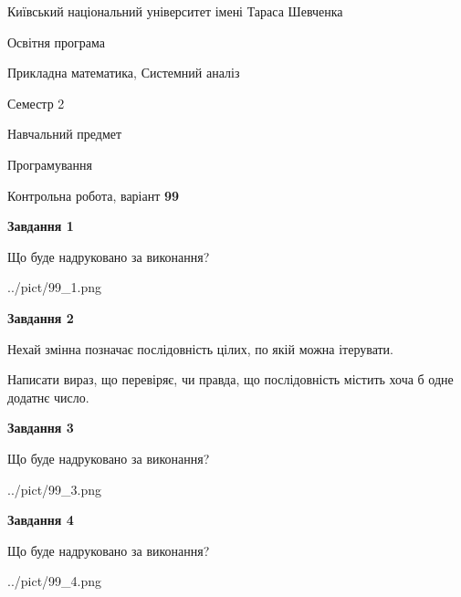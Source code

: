 \documentclass[12pt, ukrainian]{article}
\begin{document}
{{\begin {small}\par
{ \center  Київський національний університет імені Тараса Шевченка \par}
{\parbox {5 cm}{Освітня програма \hfill}{\parbox {8 cm}{Прикладна математика, Системний аналіз \hfill}}\parbox {5 cm}{\hfill Семестр 2}}\par
{\parbox {5 cm} {Навчальний предмет \hfill}\parbox {7 cm}{Програмування \hfill}\parbox {6cm}{\hfill}\par}\vspace{-7pt} \end{small}}{\center Контрольна робота, варіант  \No \textbf
{ 99 }\par}}
{
\begin {large}
{\begin {center}\textbf{Завдання 1}\end {center}}\par
Що буде надруковано за виконання?\par\par
\begin{center}
	{../pict/99_1.png}
\end{center}
\newpage

{\begin {center}\textbf{Завдання 2}\end {center}}\par
Нехай змінна  позначає послідовність цілих, по якій можна ітерувати.

Написати вираз, що перевіряє, чи правда, що послідовність  містить хоча б одне додатнє число.\par
\newpage

{\begin {center}\textbf{Завдання 3}\end {center}}\par
Що буде надруковано за виконання?
\begin{center}
	{../pict/99_3.png}
\end{center}
\newpage

{\begin {center}\textbf{Завдання 4}\end {center}}\par
Що буде надруковано за виконання?\par
\begin{center}
	{../pict/99_4.png}
\end{center}
\newpage


\end{large}}
\end{document}
